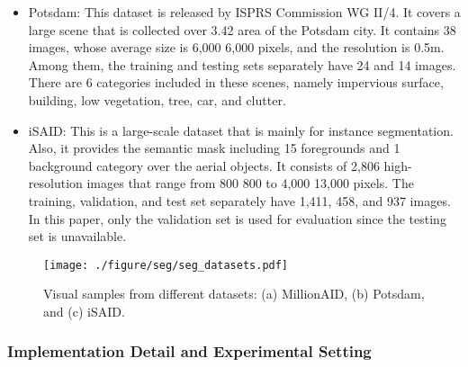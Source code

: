\documentclass[10pt, journal,twoside]{IEEEtran}
\begin{document}
\begin{itemize}
  \item Potsdam: This dataset is released by ISPRS Commission WG II/4. It covers a large scene that is collected over 3.42  area of the Potsdam city. It contains 38 images, whose average size is 6,000  6,000 pixels, and the resolution is 0.5m. Among them, the training and testing sets separately have 24 and 14 images. There are 6 categories included in these scenes, namely impervious surface, building, low vegetation, tree, car, and clutter.
  \item iSAID: This is a large-scale dataset that is mainly for instance segmentation. Also, it provides the semantic mask including 15 foregrounds and 1 background category over the aerial objects. It consists of 2,806 high-resolution images that range from 800  800 to 4,000  13,000 pixels. The training, validation, and test set separately have 1,411, 458, and 937 images. In this paper, only the validation set is used for evaluation since the testing set is unavailable.

\end{itemize}

\begin{figure}[t]
  \centering
  \texttt{[image: ./figure/seg/seg\_datasets.pdf]}
  \caption{Visual samples from different datasets: (a) MillionAID, (b) Potsdam, and (c) iSAID.}
  \label{seg_datasets}
\end{figure}

\subsubsection{Implementation Detail and Experimental Setting}
\end{document}
